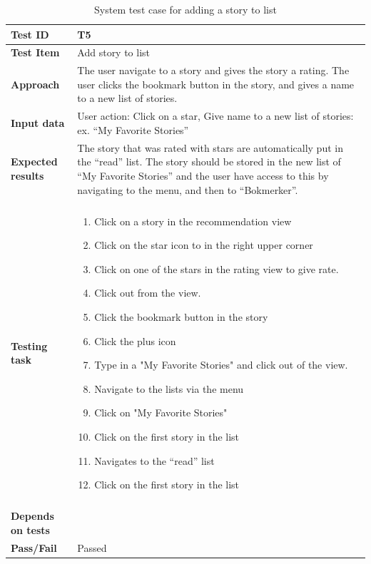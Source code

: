 \begin{appendices}
\begin{table}[H]
	\label{Tab:systemTesting4}
	\end{table}


	\begin{table}[H]
		\small
		\centering
		\caption{System test case for adding a story to list}
		\begin{tabular}{ | l | l  |}
			\hline 
			\textbf{Test ID} & T5  \\ \hline
			\textbf{Test Item}  & Add story to list	 \\ \hline
			\textbf{Approach} & \begin{minipage}{5in}The user navigate to a story and gives the story a rating. The user clicks the bookmark button in the story, and gives a name to a new list of stories.   \end{minipage}\\ \hline
			\textbf{Input data} & \begin{minipage}{5in}User action: Click on a star, Give name to a new list of stories: ex. “My Favorite Stories” \end{minipage}\\ \hline
			\textbf{Expected results} & \begin{minipage}{5in}The story that was rated with stars are automatically put in the “read” list. The story should be stored in the new list of “My Favorite Stories” and the user have access to this by navigating to the menu, and then to “Bokmerker”. \end{minipage}\\ \hline&\\[-3.8ex]
			\textbf{Testing task} & \begin{minipage}{5in}
			\begin{enumerate}[noitemsep]
			\item Click on a story in the recommendation view 
			\item Click on the star icon to in the right upper corner 
			\item Click on one of the stars in the rating view to give rate.
			\item Click out from the view. 
			\item Click the bookmark button in the story 
			\item Click the plus icon
			\item Type in a "My Favorite Stories" and click out of the view.
			\item Navigate to the lists via the menu
			\item Click on "My Favorite Stories"
			\item Click on the first story in the list
			\item Navigates to the “read” list
			\item Click on the first story in the list
			\end{enumerate}\end{minipage}
			\\ &\\[-3.8ex]\hline
			\textbf{Depends on tests} & \\ \hline			
			\textbf{Pass/Fail} & Passed \\\hline		
		\end{tabular}
	

\end{table}
\end{appendices}

